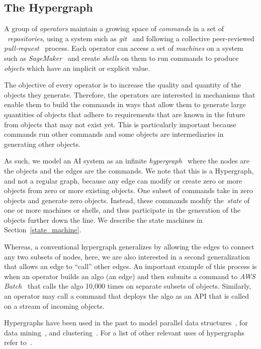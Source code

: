 \subsection{The Hypergraph}\label{hypergraph}

A group of \emph{operators} maintain a growing space of \emph{commands} in a set of ~\emph{repositories}, using a system such as \emph{git}~\cite{git} and following a collective peer-reviewed \emph{pull-request}~\cite{pull_request} process. Each operator can access a set of \emph{machines} on a system such as \emph{SageMaker}~\cite{sagemaker} and create \emph{shells} on them to run commands to produce \emph{objects} which have an implicit or explicit value.

The objective of every operator is to increase the quality and quantity of the objects they generate. Therefore, the operators are interested in mechanisms that enable them to build the commands in ways that allow them to generate large quantities of objects that adhere to requirements that are known in the future from objects that may not exist yet. This is particularly important because commands run other commands and some objects are intermediaries in generating other objects.

As such, we model an AI system as an infinite \emph{hypergraph}~\cite{Hypergraph13} where the nodes are the objects and the edges are the commands. We note that this is a Hypergraph, and not a regular graph, because any edge can modify or create zero or more objects from zero or more existing objects. One subset of commands take in zero objects and generate zero objects. Instead, these commands modify the~\emph{state} of one or more machines or shells, and thus participate in the generation of the objects further down the line. We describe the state machines in Section~\ref{state_machine}.

Whereas, a conventional hypergraph generalizes by allowing the edges to connect any two subsets of nodes, here, we are also interested in a second generalization that allows an edge to ``call'' other edges. An important example of this process is when an operator builds an algo (an edge) and then submits a command to \emph{AWS Batch}~\cite{aws_batch} that calls the algo 10,000 times on separate subsets of objects. Similarly, an operator may call a command that deploys the algo as an API that is called on a stream of incoming objects.

Hypergraphs have been used in the past to model parallel data structures~\cite{HK00}, for data mining~\cite{HBC07}, and clustering~\cite{BP09}. For a list of other relevant uses of hypergraphs refer to~\cite{Hypergraph13}.